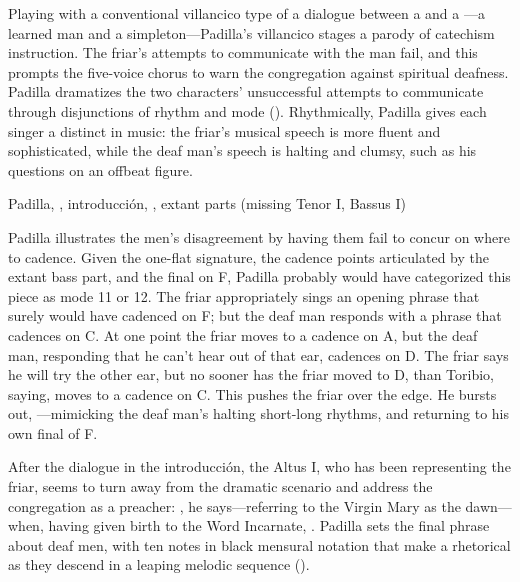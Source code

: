 Playing with a conventional villancico type of a dialogue between a 
 and a ---a learned man and a simpleton---Padilla's 
villancico stages a parody of catechism instruction.
The friar's attempts to communicate with the  man fail, and this 
prompts the five-voice chorus to warn the congregation against spiritual 
deafness.
Padilla dramatizes the two characters' unsuccessful attempts to communicate 
through disjunctions of rhythm and mode 
().
Rhythmically, Padilla gives each singer a distinct  in music: 
the friar's musical speech is more fluent and sophisticated, while the deaf 
man's speech is halting and clumsy, such as his questions  on 
an offbeat figure.

\begin{exmusic}
    \caption{Padilla, , introducción, 
    , extant parts (missing Tenor I, Bassus I)}
    \label{exmusic:Padilla-Sordo-intro}
\end{exmusic}

Padilla illustrates the men's disagreement by having them fail to concur on 
where to cadence.
Given the one-flat  signature, the cadence points 
articulated by the extant bass part, and the final on F, Padilla probably would
have categorized this piece as mode 11 or 12.%
    \Autocites[873--882]{Cerone:Melopeo}
    {Judd:RenaissanceModalTheory}{Barnett:TonalOrganization17C}
The friar appropriately sings an opening phrase that surely would have cadenced 
on F; but the deaf man responds with a phrase that cadences on C.
At one point the friar moves to a cadence on A, but the deaf man, responding 
that he can't hear out of that ear, cadences on D.
The friar says he will try the other ear, but no sooner has the friar moved to 
D, than Toribio, saying,  moves to a 
cadence on C.
This pushes the friar over the edge.
He bursts out, ---mimicking the deaf man's 
halting short-long rhythms, and returning to his own final of F.

After the dialogue in the introducción, the Altus I, who has been representing 
the friar, seems to turn away from the dramatic scenario and address the 
congregation as a preacher: , he says---referring to the Virgin Mary as the dawn---when, having given 
birth to the Word Incarnate, .
Padilla sets the final phrase about deaf men, with ten notes in black mensural 
notation that make a rhetorical  as they descend in a leaping 
melodic sequence ().

